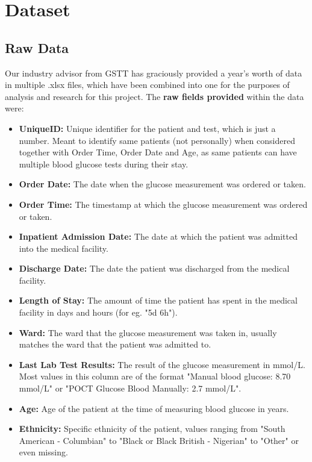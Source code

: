 \section{Dataset}

\subsection{Raw Data}

\par{\noindent

    Our industry advisor from GSTT has graciously provided a year's worth of data in multiple .xlsx files, which have been combined into one for the purposes of analysis and research for this project. The \textbf{raw fields provided} within the data were:  

    \begin{itemize}
        \item \textbf{UniqueID:} Unique identifier for the patient and test, which is just a number. Meant to identify same patients (not personally) when considered together with Order Time, Order Date and Age, as same patients can have multiple blood glucose tests during their stay. 
        \item \textbf{Order Date:} The date when the glucose measurement was ordered or taken.
        \item \textbf{Order Time:} The timestamp at which the glucose measurement was ordered or taken.
        \item \textbf{Inpatient Admission Date:} The date at which the patient was admitted into the medical facility.
        \item \textbf{Discharge Date:} The date the patient was discharged from the medical facility.
        \item \textbf{Length of Stay:} The amount of time the patient has spent in the medical facility in days and hours (for eg. "5d 6h").
        \item \textbf{Ward:} The ward that the glucose measurement was taken in, usually matches the ward that the patient was admitted to.
        \item \textbf{Last Lab Test Results:} The result of the glucose measurement in mmol/L. Most values in this column are of the format "Manual blood glucose: 8.70 mmol/L" or "POCT Glucose Blood Manually: 2.7 mmol/L".
        \item \textbf{Age:} Age of the patient at the time of measuring blood glucose in years.
        \item \textbf{Ethnicity:} Specific ethnicity of the patient, values ranging from "South American - Columbian" to "Black or Black British - Nigerian" to "Other" or even missing.

\end{itemize}}
